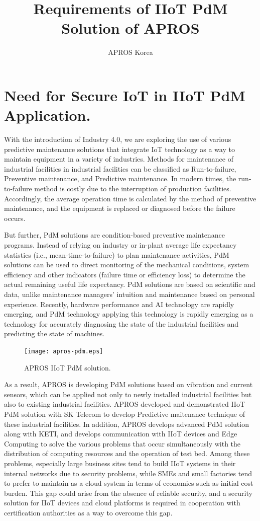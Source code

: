 \documentclass[11pt]{article}
\title{Requirements of IIoT PdM Solution of APROS}
\author{APROS Korea}
\date{}
\begin{document}
\maketitle

\section{Need for Secure IoT in IIoT PdM Application.}

With the introduction of Industry 4.0, we are exploring the use of various predictive maintenance solutions that integrate IoT technology as a way to maintain equipment in a variety of industries. Methods for maintenance of industrial facilities in industrial facilities can be classified as Run-to-failure, Preventive maintenance, and Predictive maintenance. In modern times, the run-to-failure method is costly due to the interruption of production facilities. Accordingly, the average operation time is calculated by the method of preventive maintenance, and the equipment is replaced or diagnosed before the failure occurs.

But further, PdM solutions are condition-based preventive maintenance programs. Instead of relying on industry or in-plant average life expectancy statistics (i.e., mean-time-to-failure) to plan maintenance activities, PdM solutions can be used to direct monitoring of the mechanical conditions, system efficiency and other indicators (failure time or efficiency loss) to determine the actual remaining useful life expectancy. PdM solutions are based on scientific and data, unlike maintenance managers' intuition and maintenance based on personal experience. Recently, hardware performance and AI technology are rapidly emerging, and PdM technology applying this technology is rapidly emerging as a technology for accurately diagnosing the state of the industrial facilities and predicting the state of machines.

\begin{figure}[!ht]
\centering
\texttt{[image: apros-pdm.eps]}
\caption{APROS IIoT PdM solution.}
\end{figure}

As a result, APROS is developing PdM solutions based on vibration and current sensors, which can be applied not only to newly installed industrial facilities but also to existing industrial facilities. APROS developed and demonstrated IIoT PdM solution with SK Telecom to develop Predictive maitenance technique of these industrial facilities. In addition, APROS develops advanced PdM solution along with KETI, and develops communication with IIoT devices and Edge Computing to solve the various problems that occur simultaneously with the distribution of computing resources and the operation of test bed. Among these problems, especially large business sites tend to build IIoT systems in their internal networks due to security problems, while SMEs and small factories tend to prefer to maintain as a cloud system in terms of economics such as initial cost burden. This gap could arise from the absence of reliable security, and a security solution for IIoT devices and cloud platforms is required in cooperation with certification authorities as a way to overcome this gap.
\end{document}
